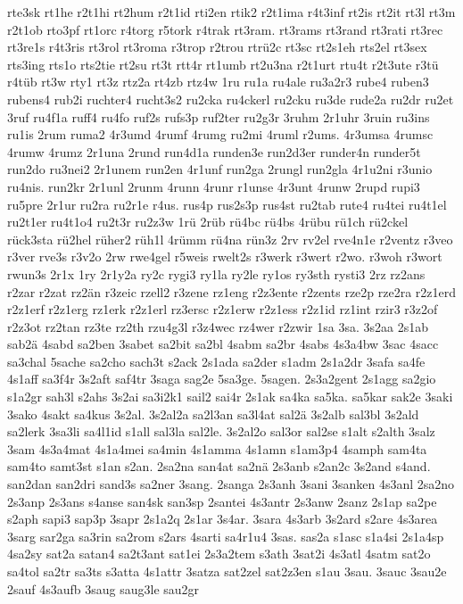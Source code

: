 {rte3sk
rt1he
r2t1hi
rt2hum
r2t1id
rti2en
rtik2
r2t1ima
r4t3inf
rt2is
rt2it
rt3l
rt3m
r2t1ob
rto3pf
rt1orc
r4torg
r5tork
r4trak
rt3ram.
rt3rams
rt3rand
rt3rati
rt3rec
rt3re1s
r4t3ris
rt3rol
rt3roma
r3trop
r2trou
rtrü2c
rt3sc
rt2s1eh
rts2el
rt3sex
rts3ing
rts1o
rts2tie
rt2su
rt3t
rtt4r
rt1umb
rt2u3na
r2t1urt
rtu4t
r2t3ute
r3tü
r4tüb
rt3w
rty1
rt3z
rtz2a
rt4zb
rtz4w
1ru
ru1a
ru4ale
ru3a2r3
rube4
ruben3
rubens4
rub2i
ruchter4
rucht3s2
ru2cka
ru4ckerl
ru2cku
ru3de
rude2a
ru2dr
ru2et
3ruf
ru4f1a
ruff4
ru4fo
ruf2s
rufs3p
ruf2ter
ru2g3r
3ruhm
2r1uhr
3ruin
ru3ins
ru1is
2rum
ruma2
4r3umd
4rumf
4rumg
ru2mi
4ruml
r2ums.
4r3umsa
4rumsc
4rumw
4rumz
2r1una
2rund
run4d1a
runden3e
run2d3er
runder4n
runder5t
run2do
ru3nei2
2r1unem
run2en
4r1unf
run2ga
2rungl
run2gla
4r1u2ni
r3unio
ru4nis.
run2kr
2r1unl
2runm
4runn
4runr
r1unse
4r3unt
4runw
2rupd
rupi3
ru5pre
2r1ur
ru2ra
ru2r1e
r4us.
rus4p
rus2s3p
rus4st
ru2tab
rute4
ru4tei
ru4t1el
ru2t1er
ru4t1o4
ru2t3r
ru2z3w
1rü
2rüb
rü4bc
rü4bs
4rübu
rü1ch
rü2ckel
rück3sta
rü2hel
rüher2
rüh1l
4rümm
rü4na
rün3z
2rv
rv2el
rve4n1e
r2ventz
r3veo
r3ver
rve3s
r3v2o
2rw
rwe4gel
r5weis
rwelt2s
r3werk
r3wert
r2wo.
r3woh
r3wort
rwun3s
2r1x
1ry
2r1y2a
ry2c
rygi3
ry1la
ry2le
ry1os
ry3sth
rysti3
2rz
rz2ans
r2zar
r2zat
rz2än
r3zeic
rzell2
r3zene
rz1eng
r2z3ente
r2zents
rze2p
rze2ra
r2z1erd
r2z1erf
r2z1erg
rz1erk
r2z1erl
rz3ersc
r2z1erw
r2z1ess
r2z1id
rz1int
rzir3
r3z2of
r2z3ot
rz2tan
rz3te
rz2th
rzu4g3l
r3z4wec
rz4wer
r2zwir
1sa
3sa.
3s2aa
2s1ab
sab2ä
4sabd
sa2ben
3sabet
sa2bit
sa2bl
4sabm
sa2br
4sabs
4s3a4bw
3sac
4sacc
sa3chal
5sache
sa2cho
sach3t
s2ack
2s1ada
sa2der
s1adm
2s1a2dr
3safa
sa4fe
4s1aff
sa3f4r
3s2aft
saf4tr
3saga
sag2e
5sa3ge.
5sagen.
2s3a2gent
2s1agg
sa2gio
s1a2gr
sah3l
s2ahs
3s2ai
sa3i2k1
sail2
sai4r
2s1ak
sa4ka
sa5ka.
sa5kar
sak2e
3saki
3sako
4sakt
sa4kus
3s2al.
3s2al2a
sa2l3an
sa3l4at
sal2ä
3s2alb
sal3bl
3s2ald
sa2lerk
3sa3li
sa4l1id
s1all
sal3la
sal2le.
3s2al2o
sal3or
sal2se
s1alt
s2alth
3salz
3sam
4s3a4mat
4s1a4mei
sa4min
4s1amma
4s1amn
s1am3p4
4samph
sam4ta
sam4to
samt3st
s1an
s2an.
2sa2na
san4at
sa2nä
2s3anb
s2an2c
3s2and
s4and.
san2dan
san2dri
sand3s
sa2ner
3sang.
2sanga
2s3anh
3sani
3sanken
4s3anl
2sa2no
2s3anp
2s3ans
s4anse
san4sk
san3sp
2santei
4s3antr
2s3anw
2sanz
2s1ap
sa2pe
s2aph
sapi3
sap3p
3sapr
2s1a2q
2s1ar
3s4ar.
3sara
4s3arb
3s2ard
s2are
4s3area
3sarg
sar2ga
sa3rin
sa2rom
s2ars
4sarti
sa4r1u4
3sas.
sas2a
s1asc
s1a4si
2s1a4sp
4sa2sy
sat2a
satan4
sa2t3ant
sat1ei
2s3a2tem
s3ath
3sat2i
4s3atl
4satm
sat2o
sa4tol
sa2tr
sa3ts
s3atta
4s1attr
3satza
sat2zel
sat2z3en
s1au
3sau.
3sauc
3sau2e
2sauf
4s3aufb
3saug
saug3le
sau2gr
}
